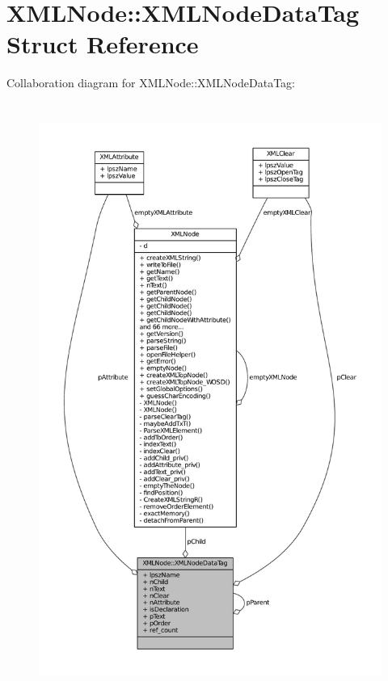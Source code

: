 \hypertarget{structXMLNode_1_1XMLNodeDataTag}{\section{X\-M\-L\-Node\-:\-:X\-M\-L\-Node\-Data\-Tag Struct Reference}
\label{structXMLNode_1_1XMLNodeDataTag}
}


Collaboration diagram for X\-M\-L\-Node\-:\-:X\-M\-L\-Node\-Data\-Tag\-:
\nopagebreak
\begin{figure}[H]
\begin{center}
\leavevmode
\includegraphics[height=550pt]{structXMLNode_1_1XMLNodeDataTag__coll__graph}
\end{center}
\end{figure}
